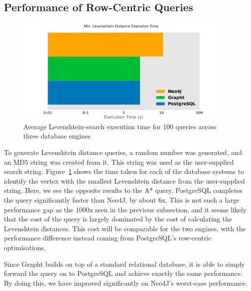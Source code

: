 
\subsection{Performance of Row-Centric Queries} %
\label{sub:performance_of_row_centric_queries}

\begin{figure}[htbp]
	\centering
	\includegraphics[width=0.95\textwidth]{figs/levengraph.eps}
	\caption{Average Levenshtein-search execution time for 100 queries across three database engines}
	\label{fig:levengraph}
\end{figure}

To generate Levenshtein distance queries, a random number was generated, and
an MD5 string was created from it. This string  was used as the user-supplied
search string. Figure~\ref{fig:levengraph} shows the time taken for each of
the database systems to identify the vertex with the smallest Levenshtein
distance from the user-supplied string. Here, we see the opposite results to
the A* query. PostgreSQL completes the query significantly faster than Neo4J,
by about 6x. This is not such a large performance gap as the 1000x seen in the
previous subsection, and it seems likely that the cost of the query is largely
dominated by the cost of calculating the Levenshtein distances. This cost will
be comparable for the two engines, with the performance difference instead coming
from PostgreSQL's row-centric optimisations.

Since Grapht builds on top of a standard relational database, it is able to
simply forward the query on to PostgreSQL and achieve exactly the same
performance. By doing this, we have improved significantly on Neo4J's worst-case
performance.


